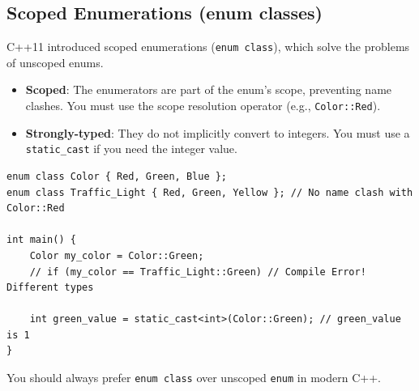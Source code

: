 \subsection{Scoped Enumerations (enum classes)}
C++11 introduced scoped enumerations (\texttt{enum class}), which solve the problems of unscoped enums.
\begin{itemize}
    \item \textbf{Scoped}: The enumerators are part of the enum's scope, preventing name clashes. You must use the scope resolution operator (e.g., \texttt{Color::Red}).
    \item \textbf{Strongly-typed}: They do not implicitly convert to integers. You must use a \texttt{static\_cast} if you need the integer value.
\end{itemize}
\begin{lstlisting}
enum class Color { Red, Green, Blue };
enum class Traffic_Light { Red, Green, Yellow }; // No name clash with Color::Red

int main() {
	Color my_color = Color::Green;
	// if (my_color == Traffic_Light::Green) // Compile Error! Different types

	int green_value = static_cast<int>(Color::Green); // green_value is 1
}
\end{lstlisting}
You should always prefer \texttt{enum class} over unscoped \texttt{enum} in modern C++.

